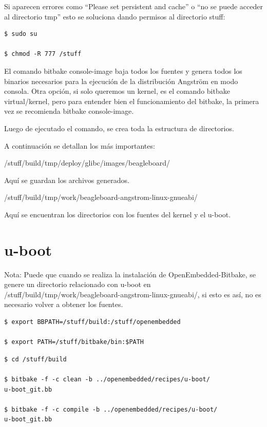 \newpage
Si aparecen errores como “Please set persistent and cache” o “no se puede acceder al directorio tmp” esto se soluciona dando permisos al directorio stuff:

\begin{verbatim}
$ sudo su

$ chmod -R 777 /stuff
\end{verbatim}

El comando bitbake console-image baja todos los fuentes y genera todos los binarios necesarios para la ejecución de la  distribución Angström en modo consola. Otra opción, si solo queremos un kernel, es el comando bitbake virtual/kernel, pero para entender bien el funcionamiento del bitbake, la primera vez se recomienda bitbake console-image.

\bigskip
Luego de ejecutado el comando, se crea toda la estructura de directorios.

\bigskip
A continuación se detallan los más importantes:

\bigskip
/stuff/build/tmp/deploy/glibc/images/beagleboard/ 

Aquí se guardan los archivos generados.

\bigskip
/stuff/build/tmp/work/beagleboard-angstrom-linux-gnueabi/

Aquí se encuentran los directorios con los fuentes del kernel y el u-boot.

\section{u-boot}\label{anx_sw_ub}

Nota: Puede que cuando se realiza la instalación de OpenEmbedded-Bitbake, se genere un directorio relacionado con u-boot en /stuff/build/tmp/work/beagleboard-angstrom-linux-gnueabi/, si esto es así, no es necesario volver a obtener los fuentes.

\bigskip
{}

\bigskip
\begin{verbatim}
$ export BBPATH=/stuff/build:/stuff/openembedded

$ export PATH=/stuff/bitbake/bin:$PATH
\end{verbatim}

\newpage
{}

\begin{verbatim}
$ cd /stuff/build

$ bitbake -f -c clean -b ../openembedded/recipes/u-boot/
u-boot_git.bb

$ bitbake -f -c compile -b ../openembedded/recipes/u-boot/
u-boot_git.bb
\end{verbatim}

